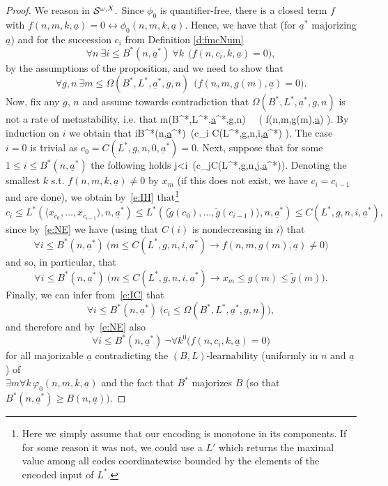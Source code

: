 \begin{proof} We reason in ${\cal S}^{\omega,X}.$
Since $\phi_0$ is quantifier-free, there is a closed term $f$ with 
$f(n,m,k,\underline{a})=0\leftrightarrow \phi_0(n,m,k,\underline{a})$. 
Hence, we have that (for $\underline{a}^*$ majorizing $\underline{a}$) and 
for the succession $c_i$ from Definition \ref{d:fmcNum} 
\[ \forall n\ \exists i\leq B^*(n,\underline{a}^*)\ \forall k\ \ \big( 
f(n,c_i,k,\underline{a})=0 \big), \]
by the assumptions of the proposition, and we need to show that
\[ \forall g,n\ \exists m\leq \Omega(B^*,L^*,\underline{a}^*,g,n) 
\ \ \big( f(n,m,g(m),\underline{a})=0 \big). \]
Now, fix any $g$, $n$ and assume towards contradiction that 
$\Omega(B^*,L^*,\underline{a}^*,g,n)$ is not a rate of metastability, i.e. that
\be[e:NE] 
\forall m\leq \Omega(B^*,L^*,\underline{a}^*,g,n)  \ \ \big( f(n,m,g(m),\underline{a}) \big).
\ee
By induction on $i$ we obtain that
\be[e:IC] 
\forall i\leq B^*(n,\underline{a}^*) \,\big(c_i\leq 
C(L^*,g,n,i,\underline{a}^*)
\big).
\ee
The case $i=0$ is trivial as $c_0=C(L^*,g,n,0,\underline{a}^*)=0$. 
Next, suppose that for some 
$1\leq i\leq B^*(n,\underline{a}^*)$ the following holds
\be[e:IH] 
\forall j<i\ \big(c_j\leq C(L^*,g,n,j,\underline{a}^*)\big). 
\ee
Denoting the smallest $k$ s.t. $f(n,m,k,\underline{a})\neq0$ by $x_m$ 
(if this does not exist, we have $c_i=c_{i-1}$ and are done), 
we obtain by~\eqref{e:IH} that\footnote{Here
we simply assume that our encoding is monotone in its components. If for some reason it was not, we could use a $L'$ which returns
the maximal value among all codes coordinatewise bounded by the elements of the encoded input of $L^*$.}
\[
   c_i\leq L^*(\langle x_{c_0},\ldots,x_{c_{i-1}}\rangle, n,\underline{a}^*)
   \leq L^*(\langle \tilde g({c_0}),\ldots,\tilde g({c_{i-1}})\rangle, n,\underline{a}^*)\le C(L^*,g,n,i,\underline{a}^*),
\]
since by~\eqref{e:NE} we have (using that $C(i)$ is nondecreasing in $i$) 
that \[ \forall i\leq B^*(n,\underline{a}^*)\ 
\big(m\leq C(L^*,g,n,i,\underline{a}^*)\rightarrow f(n,m,g(m),\underline{a})\neq0 \big)\] and 
so, in particular, that
\[ \forall i\leq B^*(n,\underline{a}^*)\ \big(m\leq C(L^*,g,n,i,\underline{a}^*)
\rightarrow x_m\leq g(m)\leq \tilde g(m) \big). \]
Finally, we can infer from~\eqref{e:IC} that
\[ \forall i\leq B^*(n,\underline{a}^*)\ 
\big(c_i\leq \Omega(B^*,L^*,\underline{a}^*,g,n)\big),\]
and therefore and by~\eqref{e:NE} also
\[ \forall i\leq B^*(n,\underline{a}^*)\ \neg\forall k^0\big( 
f(n,c_i,k,\underline{a})=0\big) \]
for all majorizable $\underline{a}$ contradicting the $(B,L)$-learnability 
(uniformly in $n$ and $\underline{a}$) of \\ 
$\exists m\forall k\,\varphi_0(n,m,k,\underline{a})$ and the fact that $B^*$ 
majorizes $B$ (so that $B^*(n,\underline{a}^*)\ge B(n,\underline{a})).$
\end{proof}

